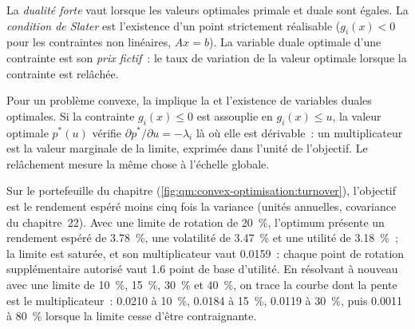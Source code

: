 \begin{definition}\label{def:qm:convex-optimisation:strong}
La \emph{dualité forte} vaut lorsque les valeurs optimales primale et duale sont égales. La \emph{condition de Slater} est l'existence d'un
point strictement réalisable ($g_i(x) < 0$ pour les contraintes non linéaires, $Ax = b$). La variable duale optimale d'une contrainte est son \emph{prix fictif}~: le
taux de variation de la valeur optimale lorsque la contrainte est relâchée.
\end{definition}

Pour un problème convexe, la  implique la  et l'existence de variables duales optimales. Si la contrainte $g_i(x) \le 0$ est assouplie en $g_i(x) \le u$,
la valeur optimale $p^*(u)$ vérifie $\partial p^*/\partial u = -\lambda_i$ là où elle est dérivable~: un multiplicateur est la valeur marginale de la limite, exprimée dans l'unité de
l'objectif. Le relâchement mesure la même chose à l'échelle globale.

Sur le portefeuille du chapitre (\cref{fig:qm:convex-optimisation:turnover}), l'objectif est le rendement espéré moins cinq fois la variance (unités annuelles, covariance du
chapitre~22). Avec une limite de rotation de 20~\%, l'optimum présente un rendement espéré de 3.78~\%, une volatilité de 3.47~\% et une utilité de 3.18~\%~; la limite est saturée, et son multiplicateur vaut
0.0159~: chaque point de rotation supplémentaire autorisé vaut 1.6 point de base d'utilité. En résolvant à nouveau avec une limite de 10~\%, 15~\%, 30~\% et 40~\%, on trace la courbe dont la
pente est le multiplicateur~: 0.0210 à 10~\%, 0.0184 à 15~\%, 0.0119 à 30~\%, puis 0.0011 à 80~\% lorsque la limite cesse d'être contraignante.

